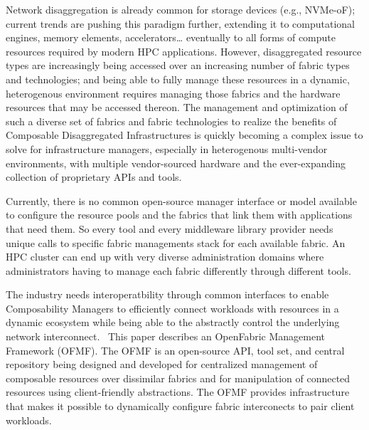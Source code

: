 Network disaggregation is already common for storage devices (e.g., NVMe-oF); current trends are pushing this paradigm further, extending it to computational engines, memory elements, accelerators… eventually to all forms of compute resources required by modern HPC applications.  However, disaggregated resource types are increasingly being accessed over an increasing number of fabric types and technologies; and being able to fully manage these resources in a dynamic, heterogenous environment requires managing those fabrics and the hardware resources that may be accessed thereon. The management and optimization of such a diverse set of fabrics and fabric technologies to realize the benefits of Composable Disaggregated Infrastructures is quickly becoming a complex issue to solve for infrastructure managers, especially in heterogenous multi-vendor environments, with multiple vendor-sourced hardware and the ever-expanding collection of proprietary APIs and tools. 

Currently, there is no common open-source manager interface or model available to configure the resource pools and the fabrics that link them with applications that need them. So every tool and every middleware library provider needs unique calls to specific fabric managements stack for each available fabric.  An HPC cluster can end up with very diverse administration domains where administrators having to manage each fabric differently through different tools.

The industry needs interoperatbility through common interfaces to enable Composability Managers to efficiently connect workloads with resources in a dynamic ecosystem while being able to the abstractly control the underlying network interconnect.  This paper describes an OpenFabric Management Framework (OFMF).  The OFMF is an open-source API, tool set, and central repository being designed and developed for centralized management of composable resources over dissimilar fabrics and for manipulation of connected resources using client-friendly abstractions.  The OFMF provides infrastructure that makes it possible to dynamically configure fabric interconects to pair client workloads.

  


